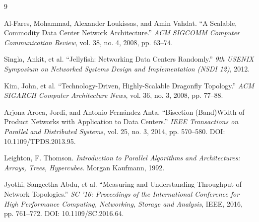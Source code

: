 \documentclass[conference]{IEEEtran}
\begin{document}
\begin{thebibliography}{9}

Al-Fares, Mohammad, Alexander Loukissas, and Amin Vahdat. ``A Scalable, Commodity Data Center Network Architecture.'' \textit{ACM SIGCOMM Computer Communication Review}, vol. 38, no. 4, 2008, pp. 63--74.

Singla, Ankit, et al. ``Jellyfish: Networking Data Centers Randomly.'' \textit{9th USENIX Symposium on Networked Systems Design and Implementation (NSDI 12)}, 2012.

Kim, John, et al. ``Technology-Driven, Highly-Scalable Dragonfly Topology.'' \textit{ACM SIGARCH Computer Architecture News}, vol. 36, no. 3, 2008, pp. 77--88.

Arjona Aroca, Jordi, and Antonio Fernández Anta. ``Bisection (Band)Width of Product Networks with Application to Data Centers.'' \textit{IEEE Transactions on Parallel and Distributed Systems}, vol. 25, no. 3, 2014, pp. 570--580. DOI: 10.1109/TPDS.2013.95.

Leighton, F. Thomson. \textit{Introduction to Parallel Algorithms and Architectures: Arrays, Trees, Hypercubes}. Morgan Kaufmann, 1992.

Jyothi, Sangeetha Abdu, et al. ``Measuring and Understanding Throughput of Network Topologies.'' \textit{SC '16: Proceedings of the International Conference for High Performance Computing, Networking, Storage and Analysis}, IEEE, 2016, pp. 761--772. DOI: 10.1109/SC.2016.64.

\end{thebibliography}
\end{document}
